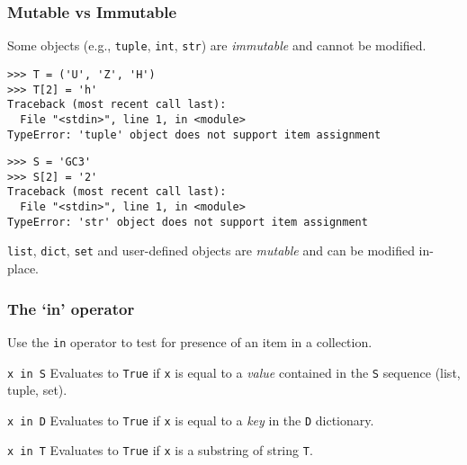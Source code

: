 \documentclass[english,serif,mathserif,xcolor=pdftex,dvipsnames,table]{beamer}
\begin{document}
\begin{frame}[fragile]
  \frametitle{Mutable vs Immutable}
  Some objects (e.g., \texttt{tuple}, \texttt{int}, \texttt{str})
  are \emph{immutable} and cannot be modified.
\begin{lstlisting}[basicstyle=\footnotesize\ttfamily]
>>> T = ('U', 'Z', 'H')
>>> T[2] = 'h'
Traceback (most recent call last):
  File "<stdin>", line 1, in <module>
TypeError: 'tuple' object does not support item assignment
\end{lstlisting}

\+
\begin{lstlisting}
>>> S = 'GC3'
>>> S[2] = '2'
Traceback (most recent call last):
  File "<stdin>", line 1, in <module>
TypeError: 'str' object does not support item assignment
\end{lstlisting}


  \+
  \texttt{list}, \texttt{dict}, \texttt{set} and user-defined objects
  are \emph{mutable} and can be modified in-place.
\end{frame}


\begin{frame}[fragile]
  \frametitle{The `{\ttfamily\bfseries in}' operator}

  Use the \lstinline|in| operator to test for presence of an item in a
  collection.

  \begin{describe}{\lstinline|x in S|}
    Evaluates to \texttt{True} if \lstinline|x| is equal to a \emph{value}
    contained in the \lstinline|S| sequence (list, tuple, set).
  \end{describe}

  \begin{describe}{\lstinline|x in D|}
    Evaluates to \texttt{True} if \lstinline|x| is equal to a \emph{key}
    in the \lstinline|D| dictionary.
  \end{describe}

  \begin{describe}{\lstinline|x in T|}
    Evaluates to \texttt{True} if \lstinline|x| is a substring of
    string \lstinline|T|.
  \end{describe}

\end{frame}



\end{document}
